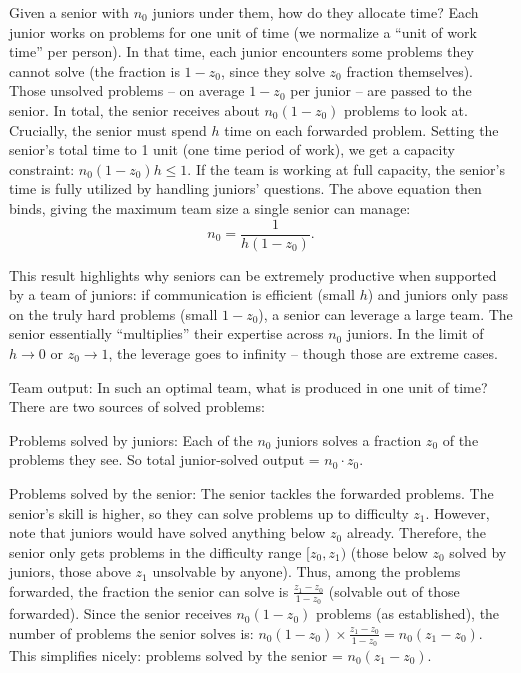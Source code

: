 \documentclass[12pt]{article}
\begin{document}
Given a senior with \(n_0\) juniors under them, how do they allocate
time? Each junior works on problems for one unit of time (we normalize a
``unit of work time'' per person). In that time, each junior encounters
some problems they cannot solve (the fraction is \(1 - z_0\), since they
solve \(z_0\) fraction themselves). Those unsolved problems -- on
average \(1-z_0\) per junior -- are passed to the senior. In total, the
senior receives about \(n_0 (1 - z_0)\) problems to look at.
{Crucially, the senior must spend \(h\) time on each forwarded
problem.} Setting the senior's total time to 1 unit (one time period of
work), we get a capacity constraint: \(n_0 (1 - z_0) h \le 1.\) If the
team is working at full capacity, the senior's time is fully utilized by
handling juniors' questions. The above equation then binds, giving the
{maximum team size} a single senior can manage: 
\begin{equation}
n_0 =
\frac{1}{h(1 - z_0)}. \tag{1}
\end{equation}

This result highlights why seniors can be extremely productive when
supported by a team of juniors: if communication is efficient (small
\(h\)) and juniors only pass on the truly hard problems (small
\(1-z_0\)), a senior can leverage a large team. {The senior
essentially ``multiplies'' their expertise across \(n_0\) juniors.} In
the limit of \(h \to 0\) or \(z_0 \to 1\), the leverage goes to infinity
-- though those are extreme cases.

{Team output:} In such an optimal team, what is produced in one
unit of time? There are two sources of solved problems:

{Problems solved by juniors:} Each of the \(n_0\) juniors
  solves a fraction \(z_0\) of the problems they see. So total
  junior-solved output = \(n_0 \cdot z_0\).

{Problems solved by the senior:} The senior tackles the
forwarded problems. The senior's skill is higher, so they can solve
problems up to difficulty \(z_1\). However, note that juniors would
have solved anything below \(z_0\) already. Therefore, the senior only
{gets} problems in the difficulty range \([z_0, z_1)\) (those
below \(z_0\) solved by juniors, those above
$z_1$ unsolvable by anyone). Thus, among the problems forwarded, the fraction the senior can solve is \(\frac{z_1 - z_0}{1 - z_0}\)
(solvable out of those forwarded). Since the senior receives
\(n_0(1-z_0)\) problems (as established), the number of problems the
senior solves is:
\(n_0 (1-z_0) \times \frac{z_1 - z_0}{1 - z_0} = n_0(z_1 - z_0).\)
This simplifies nicely: {problems solved by the senior =
\(n_0 (z_1 - z_0)\).}
\end{document}
